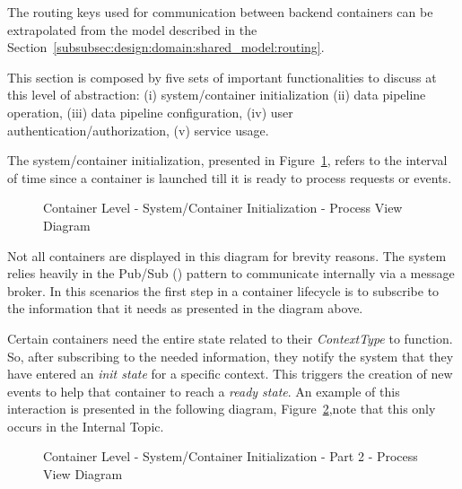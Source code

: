 The routing keys used for communication between backend containers can be extrapolated from the model described in the Section~\ref{subsubsec:design:domain:shared_model:routing}. 

This section is composed by five sets of important functionalities to discuss at this level of abstraction: (i) system/container initialization (ii) data pipeline operation, (iii) data pipeline configuration, (iv) user authentication/authorization, (v) service usage.

The system/container initialization, presented in Figure~\ref{fig:design:architecture:container:process:diagram:init}, refers to the interval of time since a container is launched till it is ready to process requests or events.

\begin{figure}[H]
   \centering
   \resizebox{\columnwidth}{!}
   {      
      
   }
   \caption[Container Level - System/Container Initialization - Process View Diagram]{Container Level - System/Container Initialization - Process View Diagram}
   \label{fig:design:architecture:container:process:diagram:init}
\end{figure}

Not all containers are displayed in this diagram for brevity reasons.
The system relies heavily in the Pub/Sub (\cite{pubsub}) pattern to communicate internally via a message broker. In this scenarios the first step in a container lifecycle is to subscribe to the information that it needs as presented in the diagram above.

Certain containers need the entire state related to their \textit{ContextType} to function. So, after subscribing to the needed information, they notify the system that they have entered an \textit{init state} for a specific context. This triggers the creation of new events to help that container to reach a \textit{ready state}. An example of this interaction is presented in the following diagram, Figure~\ref{fig:design:architecture:container:process:diagram:ready},note that this only occurs in the Internal Topic.

\begin{figure}[H]
   \centering
   \resizebox{\columnwidth}{!}
   {      
      
   }
   \caption[Container Level - System/Container Initialization - Part 2 - Process View Diagram]{Container Level - System/Container Initialization - Part 2 - Process View Diagram}
   \label{fig:design:architecture:container:process:diagram:ready}
\end{figure}

